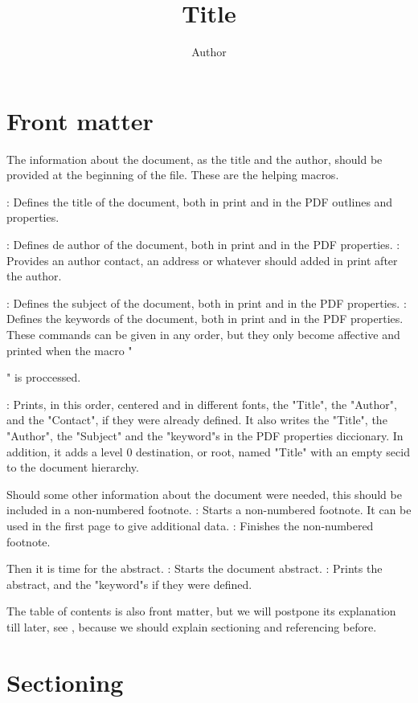 \section{Front matter}

The information about the document, as the title and the author,
should be provided at the beginning of the file.
These are the helping macros.
\command\title{Title}: Defines the title
 of the document, both in print and in the PDF outlines and properties.
\command\author{Author}: Defines de author
 of the document, both in print and in the PDF properties.
\command{}: Provides an author contact, an address
 or whatever should added in print after the author.
\command\subject{Subject}: Defines the subject
 of the document, both in print and in the PDF properties.
\command{}: Defines the keywords
 of the document, both in print and in the PDF properties.
\continuepar
These commands can be given in any order,
but they only become affective and printed
when the macro "\maketitle" is proccessed.
\command\maketitle: Prints, in this order, centered and in
different fonts, the "Title", the "Author", and the "Contact",
if they were already defined.
It also writes the "Title", the "Author", the "Subject" and
the "keyword"s in the PDF properties diccionary.
In addition, it adds a level 0 destination, or root,
named "Title" with an empty {\sc secid} to the document
hierarchy.

Should some other information about the document were needed,
this should be included in a non-numbered footnote.
\command\beginnote: Starts a non-numbered footnote.
 It can be used in the first page to give additional data.
\command\endnote: Finishes the non-numbered footnote.

Then it is time for the abstract.
\command\beginabstract: Starts the document abstract.
\command\endabstract: Prints the abstract, and the
"keyword"s if they were defined.

The table of contents is also front matter,
but we will postpone its explanation till later,
see ,
because we should explain sectioning and referencing before.


\section{Sectioning}

